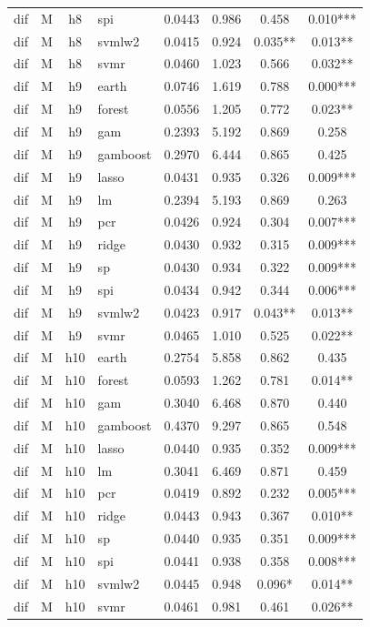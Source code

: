 \begin{ThreePartTable}
\begin{longtable}[t]{llclcccc}
dif & M & h8 & spi & 0.0443 & 0.986 & 0.458 & 0.010***\\
dif & M & h8 & svmlw2 & 0.0415 & 0.924 & 0.035** & 0.013**\\
dif & M & h8 & svmr & 0.0460 & 1.023 & 0.566 & 0.032**\\
\addlinespace
dif & M & h9 & earth & 0.0746 & 1.619 & 0.788 & 0.000***\\
dif & M & h9 & forest & 0.0556 & 1.205 & 0.772 & 0.023**\\
dif & M & h9 & gam & 0.2393 & 5.192 & 0.869 & 0.258\\
dif & M & h9 & gamboost & 0.2970 & 6.444 & 0.865 & 0.425\\
dif & M & h9 & lasso & 0.0431 & 0.935 & 0.326 & 0.009***\\
dif & M & h9 & lm & 0.2394 & 5.193 & 0.869 & 0.263\\
dif & M & h9 & pcr & 0.0426 & 0.924 & 0.304 & 0.007***\\
dif & M & h9 & ridge & 0.0430 & 0.932 & 0.315 & 0.009***\\
dif & M & h9 & sp & 0.0430 & 0.934 & 0.322 & 0.009***\\
dif & M & h9 & spi & 0.0434 & 0.942 & 0.344 & 0.006***\\
dif & M & h9 & svmlw2 & 0.0423 & 0.917 & 0.043** & 0.013**\\
dif & M & h9 & svmr & 0.0465 & 1.010 & 0.525 & 0.022**\\
\addlinespace
dif & M & h10 & earth & 0.2754 & 5.858 & 0.862 & 0.435\\
dif & M & h10 & forest & 0.0593 & 1.262 & 0.781 & 0.014**\\
dif & M & h10 & gam & 0.3040 & 6.468 & 0.870 & 0.440\\
dif & M & h10 & gamboost & 0.4370 & 9.297 & 0.865 & 0.548\\
dif & M & h10 & lasso & 0.0440 & 0.935 & 0.352 & 0.009***\\
dif & M & h10 & lm & 0.3041 & 6.469 & 0.871 & 0.459\\
dif & M & h10 & pcr & 0.0419 & 0.892 & 0.232 & 0.005***\\
dif & M & h10 & ridge & 0.0443 & 0.943 & 0.367 & 0.010**\\
dif & M & h10 & sp & 0.0440 & 0.935 & 0.351 & 0.009***\\
dif & M & h10 & spi & 0.0441 & 0.938 & 0.358 & 0.008***\\
dif & M & h10 & svmlw2 & 0.0445 & 0.948 & 0.096* & 0.014**\\
dif & M & h10 & svmr & 0.0461 & 0.981 & 0.461 & 0.026**\\

\end{longtable}
\end{ThreePartTable}
